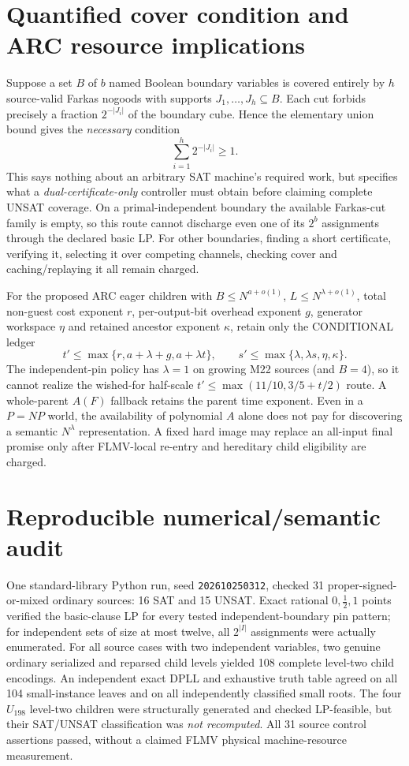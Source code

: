\documentclass[11pt]{article}
\begin{document}
\section{Quantified cover condition and ARC resource implications}
Suppose a set \(B\) of \(b\) named Boolean boundary variables is
covered entirely by \(h\) source-valid Farkas nogoods with supports
\(J_1,\dots,J_h\subseteq B\). Each cut forbids precisely a
fraction \(2^{-|J_i|}\) of the boundary cube. Hence the elementary
union bound gives the \emph{necessary} condition
\[
\sum_{i=1}^{h}2^{-|J_i|}\ge1.
\]
This says nothing about an arbitrary SAT machine's required work,
but specifies what a \emph{dual-certificate-only} controller must
obtain before claiming complete UNSAT coverage. On a primal-independent
boundary the available Farkas-cut family is empty, so this route
cannot discharge even one of its \(2^b\) assignments through
the declared basic LP. For other boundaries, finding a short
certificate, verifying it, selecting it over competing channels,
checking cover and caching/replaying it all remain charged.

For the proposed ARC eager children with \(B\le N^{a+o(1)}\),
\(L\le N^{\lambda+o(1)}\), total non-guest cost exponent \(r\),
per-output-bit overhead exponent \(g\), generator workspace \(\eta\)
and retained ancestor exponent \(\kappa\), retain only the
CONDITIONAL ledger
\[
t'\le\max\{r,a+\lambda+g,a+\lambda t\},\qquad
s'\le\max\{\lambda,\lambda s,\eta,\kappa\}.
\]
The independent-pin policy has \(\lambda=1\) on growing M22
sources (and \(B=4\)), so it cannot realize the wished-for half-scale
\(t'\le\max(11/10,3/5+t/2)\) route. A whole-parent \(A(F)\)
fallback retains the parent time exponent. Even in a \(P=NP\)
world, the availability of polynomial \(A\) alone does not
pay for discovering a semantic \(N^\lambda\) representation.
A fixed hard image may replace an all-input final promise only
after FLMV-local re-entry and hereditary child eligibility are charged.

\section{Reproducible numerical/semantic audit}
One standard-library Python run, seed \texttt{202610250312},
checked 31 proper-signed-or-mixed ordinary sources: 16 SAT and
15 UNSAT. Exact rational \(0,\frac12,1\) points verified
the basic-clause LP for every tested independent-boundary
pin pattern; for independent sets of size at most twelve,
all \(2^{|I|}\) assignments were actually enumerated.
For all source cases with two independent variables, two
genuine ordinary serialized and reparsed child levels yielded
108 complete level-two child encodings. An independent exact
DPLL and exhaustive truth table agreed on all 104
small-instance leaves and on all independently classified
small roots. The four \(U_{198}\) level-two children were
structurally generated and checked LP-feasible, but their
SAT/UNSAT classification was \emph{not recomputed}.
All 31 source control assertions passed, without a claimed
FLMV physical machine-resource measurement.
\end{document}
